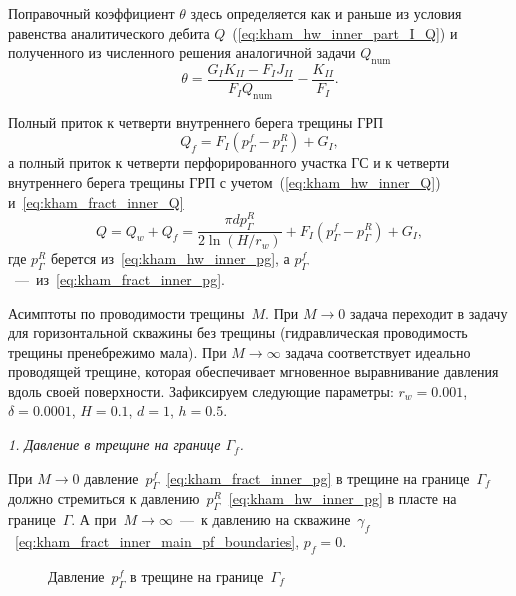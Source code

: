 \documentclass{article}
\newcommand{\mysub}[1]{%
  \par\vspace{0.5em}\noindent{\normalsize\underline{#1}}\par\vspace{0.5em}%
}
\begin{document}
Поправочный коэффициент $\theta$ здесь определяется как и раньше из условия равенства аналитического
дебита $Q$~(\ref{eq:kham_hw_inner_part_I_Q}) и полученного из численного решения аналогичной задачи $Q_{\text{num}}$
\begin{equation}
	\displaystyle
	\theta = \dfrac{G_I K_{II} - F_I J_{II}}{F_I Q_{\text{num}}} -  \dfrac{K_{II}}{F_I}.
	\label{eq:kham_fract_inner_theta}
\end{equation}

Полный приток  к четверти внутреннего берега трещины ГРП
\begin{equation}
	Q_f = F_I \left(p^f_{\Gamma} - p^R_{\Gamma}\right) + G_I,
	\label{eq:kham_fract_inner_Q}
\end{equation}
а полный приток  к четверти перфорированного участка ГС и к четверти внутреннего берега трещины ГРП
с учетом~(\ref{eq:kham_hw_inner_Q}) и~\eqref{eq:kham_fract_inner_Q}
\begin{equation}
	\displaystyle
	Q = Q_w + Q_f = \dfrac{\pi d p^R_{\Gamma}}{2 \ln{\left(H / r_w\right)}} + F_I \left(p^f_{\Gamma} - p^R_{\Gamma}\right) + G_I,
	\label{eq:kham_fract_inner_q_total}
\end{equation}
где $p^R_{\Gamma}$ берется из~\eqref{eq:kham_hw_inner_pg}, а $p^f_{\Gamma}$~---~из~\eqref{eq:kham_fract_inner_pg}.

\mysub{\textbf{Базовые проверки}}

Асимптоты по проводимости трещины~$M$. 
При $M \to 0$ задача переходит в задачу для горизонтальной скважины без трещины (гидравлическая проводимость трещины пренебрежимо мала).
При $M \to \infty$ задача соответствует идеально проводящей трещине, которая обеспечивает мгновенное выравнивание давления вдоль своей поверхности.
Зафиксируем следующие параметры: $r_w = 0.001$, $\delta=0.0001$, $H=0.1$, $d=1$, $h=0.5$.

\textit{ 1. Давление в трещине на границе $\Gamma_f$.}

При $M \to 0$ давление~$p_{\Gamma}^f$~\eqref{eq:kham_fract_inner_pg} в трещине на границе~$\Gamma_f$ должно 
стремиться к давлению~$p_{\Gamma}^R$~\eqref{eq:kham_hw_inner_pg} в пласте на границе~$\Gamma$. 
А при~$M \to \infty$~---~к давлению на 
скважине~$\gamma_f$~\eqref{eq:kham_fract_inner_main_pf_boundaries}, $p_f = 0$.

\begin{figure}[H]
	\centering
	
	\caption{ Давление~$p_{\Gamma}^f$ в трещине на границе~$\Gamma_f$}
	\label{fig:kham_fract_inner_pgf_assympt}
\end{figure}
\end{document}
